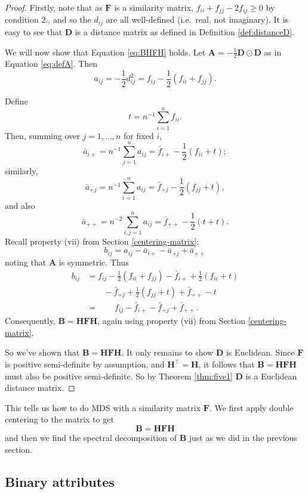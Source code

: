 \documentclass[
]{book}
\theoremstyle{definition}
\theoremstyle{definition}
\theoremstyle{definition}
\theoremstyle{definition}
\theoremstyle{remark}
\begin{document}
\begin{proof}
Firstly, note that as \(\mathbf F\) is a similarity matrix, \(f_{ii}+f_{jj}-2f_{ij}\geq 0\) by condition 2., and so the \(d_{ij}\) are all well-defined (i.e.~real, not imaginary).
It is easy to see that \(\mathbf D\) is a distance matrix as defined in Definition \ref{def:distanceD}.

We will now show that Equation \eqref{eq:BHFH} holds. Let \(\mathbf A= -\frac{1}{2}\mathbf D\odot \mathbf D\) as in Equation \eqref{eq:defA}. Then
\[
a_{ij}=-\frac{1}{2}d_{ij}^2 =f_{ij}-\frac{1}{2}(f_{ii}+f_{jj}).
\]

Define
\[
t=n^{-1}\sum_{i=1}^n f_{ii}.
\]
Then, summing over \(j=1, \ldots , n\) for fixed \(i\),
\[
\bar{a}_{i+}=n^{-1}\sum_{j=1}^n a_{ij} = \bar{f}_{i+}-\frac{1}{2}(f_{ii}+t);
\]
similarly,
\[
\bar{a}_{+j}=n^{-1}\sum_{i=1}^n a_{ij}=\bar{f}_{+j}-\frac{1}{2}(f_{jj}+t),
\]
and also
\[
\bar{a}_{++}=n^{-2}\sum_{i,j=1}^n a_{ij}=\bar{f}_{++}-\frac{1}{2}(t+t).
\]
Recall property (vii) from Section \ref{centering-matrix}:
\[
b_{ij}=a_{ij}-\bar{a}_{i+}-\bar{a}_{+j}+\bar{a}_{++}
\]
noting that \(\mathbf A\) is symmetric. Thus
\begin{align*} 
b_{ij}&=f_{ij}-\frac{1}{2}(f_{ii}+f_{jj})-\bar{f}_{i+}+\frac{1}{2}(f_{ii}+t)\\
& \qquad -\bar{f}_{+j}+\frac{1}{2}(f_{jj}+t) +\bar{f}_{++}-t\\
& =\qquad f_{ij}-\bar{f}_{i+}-\bar{f}_{+j}+\bar{f}_{++}.
\end{align*}
Consequently, \(\mathbf B=\mathbf H\mathbf F\mathbf H\), again using property (vii) from Section \ref{centering-matrix}.

So we've shown that \(\mathbf B= \mathbf H\mathbf F\mathbf H\). It only remains to show \(\mathbf D\) is Euclidean. Since \(\mathbf F\) is positive semi-definite by assumption, and \(\mathbf H^\top =\mathbf H\), it follows that \(\mathbf B=\mathbf H\mathbf F\mathbf H\) must also be positive semi-definite. So by Theorem \ref{thm:five1} \(\mathbf D\) is a Euclidean distance matrix.
\end{proof}

This tells us how to do MDS with a similarity matrix \(\mathbf F\). We first apply double centering to the matrix to get
\[\mathbf B=\mathbf H\mathbf F\mathbf H\]
and then we find the spectral decomposition of \(\mathbf B\) just as we did in the previous section.

\subsection{Binary attributes}\label{binary-attributes}
\end{document}
